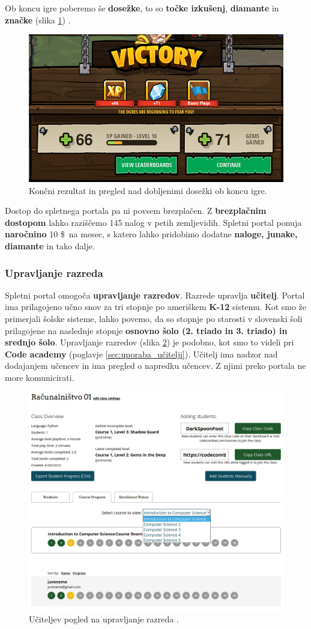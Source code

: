  Ob koncu igre poberemo še \textbf{dosežke}, to so \textbf{točke
   izkušenj}, \textbf{diamante} in \textbf{značke} (slika
 \ref{fig:web:cc:ingame:ach}) . 

\begin{figure}[h!]
  \centering
    \includegraphics [width=0.35\linewidth, keepaspectratio =
   1] {./images/sc_web/cc_ingame-ach-v02.jpg}
   \caption{Končni rezultat in pregled nad dobljenimi dosežki ob koncu
     igre\cite{web:codecombat}.}
   \label{fig:web:cc:ingame:ach}
 \end{figure}

 Dostop do spletnega portala pa ni povsem brezplačen. Z
 \textbf{brezplačnim dostopom} lahko raziščemo 145 nalog v petih
 zemljevidih. Spletni portal ponuja \textbf{naročnino} 10 \$\ na mesec, s
 katero lahko pridobimo dodatne \textbf{naloge, junake, diamante} in
 tako dalje.
 
\subsubsection{Upravljanje razreda}
\label{sec:upravljanje_razreda_cc}

Spletni portal omogoča \textbf{upravljanje razredov}. Razrede upravlja
\textbf{učitelj}.  Portal ima prilagojeno učno snov za tri stopnje po
ameriškem \textbf{K-12} sistemu. Kot smo že primerjali šolske sisteme,
lahko povemo, da so stopnje po starosti v slovenski šoli prilagojene
na naslednje stopnje \textbf{osnovno šolo (2. triado in 3. triado) in
  srednjo šolo}. Upravljanje razredov (slika \ref{fig:web:cc:teach})
je podobno, kot smo to videli pri \textbf{Code academy} (poglavje
\ref{sec:uporaba_učitelji}). Učitelj ima nadzor nad dodajanjem učencev
in ima pregled o napredku učencev. Z njimi preko portala ne more
komunicirati.

\begin{figure}[ht!]
  \centering
    \includegraphics [width=0.75\linewidth, keepaspectratio =
   1] {./images/sc_web/cc_teach-clsv-v01.jpg}
   \caption{Učiteljev pogled na upravljanje razreda \cite{web:codecombat}.}
   \label{fig:web:cc:teach}
\end{figure}

